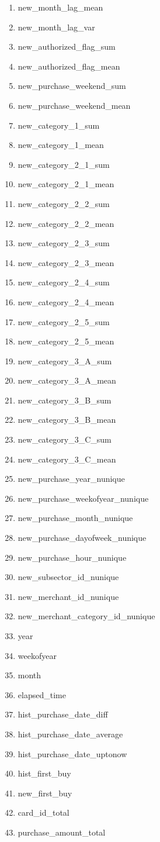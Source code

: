 \documentclass{article}
\begin{document}
\begin{enumerate}
\item new\_month\_lag\_mean
\item new\_month\_lag\_var
\item new\_authorized\_flag\_sum
\item new\_authorized\_flag\_mean
\item new\_purchase\_weekend\_sum
\item new\_purchase\_weekend\_mean
\item new\_category\_1\_sum
\item new\_category\_1\_mean
\item new\_category\_2\_1\_sum
\item new\_category\_2\_1\_mean
\item new\_category\_2\_2\_sum
\item new\_category\_2\_2\_mean
\item new\_category\_2\_3\_sum
\item new\_category\_2\_3\_mean
\item new\_category\_2\_4\_sum
\item new\_category\_2\_4\_mean
\item new\_category\_2\_5\_sum
\item new\_category\_2\_5\_mean
\item new\_category\_3\_A\_sum
\item new\_category\_3\_A\_mean
\item new\_category\_3\_B\_sum
\item new\_category\_3\_B\_mean
\item new\_category\_3\_C\_sum
\item new\_category\_3\_C\_mean
\item new\_purchase\_year\_nunique
\item new\_purchase\_weekofyear\_nunique
\item new\_purchase\_month\_nunique
\item new\_purchase\_dayofweek\_nunique
\item new\_purchase\_hour\_nunique
\item new\_subsector\_id\_nunique
\item new\_merchant\_id\_nunique
\item new\_merchant\_category\_id\_nunique
\item year
\item weekofyear
\item month
\item elapsed\_time
\item hist\_purchase\_date\_diff
\item hist\_purchase\_date\_average
\item hist\_purchase\_date\_uptonow
\item hist\_first\_buy
\item new\_first\_buy
\item card\_id\_total
\item purchase\_amount\_total
\end{enumerate}
\end{document}
